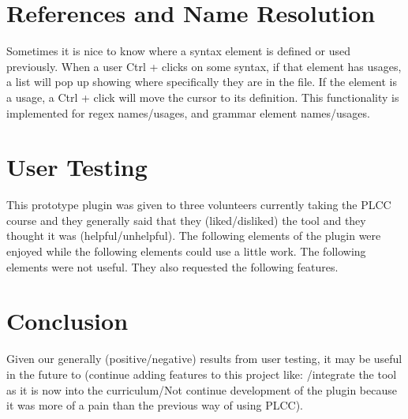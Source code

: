 \documentclass[12pt]{article}
\begin{document}
{\section{References and Name Resolution}
Sometimes it is nice to know where a syntax element is defined or used previously.
When a user Ctrl + clicks on some syntax, if that element has usages, a list will pop up showing where specifically they are in the file.
If the element is a usage, a Ctrl + click will move the cursor to its definition.
This functionality is implemented for regex names/usages, and grammar element names/usages.

\section{User Testing}
This prototype plugin was given to three volunteers currently taking the PLCC course and they generally said that they (liked/disliked) the tool and they thought it was (helpful/unhelpful).
The following elements of the plugin were enjoyed while the following elements could use a little work. The following elements were not useful.
They also requested the following features.

\section{Conclusion}
Given our generally (positive/negative) results from user testing, it may be useful in the future to (continue adding features to this project like: /integrate the tool as it is now into the curriculum/Not continue development of the plugin because it was more of a pain than the previous way of using PLCC).





}
\end{document}
